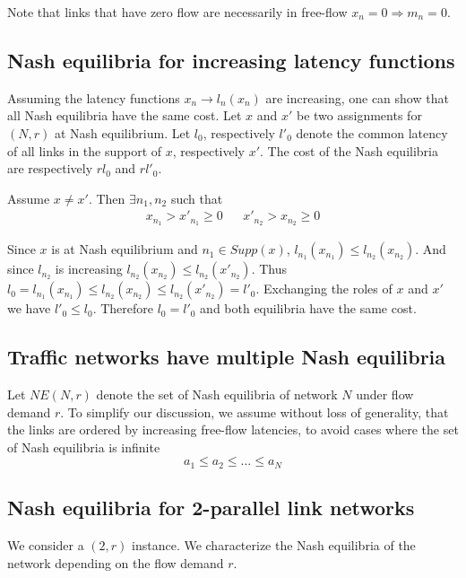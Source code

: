 Note that links that have zero flow are necessarily in free-flow $x_n = 0 \Rightarrow m_n = 0$.

\subsection{Nash equilibria for increasing latency functions}
Assuming the latency functions $x_n \rightarrow l_n(x_n)$ are increasing, one can show that all Nash equilibria have the same cost. Let $x$ and $x'$ be two assignments for $(N, r)$ at Nash equilibrium.  Let $l_0$, respectively $l'_0$ denote the common latency of all links in the support of $x$, respectively $x'$. The cost of the Nash equilibria are respectively $rl_0$ and $rl'_0$.

Assume $x \neq x'$. Then $\exists n_1, n_2$ such that
\begin{align*}
x_{n_1} > x'_{n_1} \geq 0 && x'_{n_2} > x_{n_2} \geq 0
\end{align*}

Since $x$ is at Nash equilibrium and $n_1 \in Supp(x)$, $l_{n_1}(x_{n_1}) \leq l_{n_2}(x_{n_2})$. And since $l_{n_2}$ is increasing $l_{n_2}(x_{n_2}) \leq l_{n_2}(x'_{n_2})$. Thus $l_0 = l_{n_1}(x_{n_1}) \leq l_{n_2}(x_{n_2}) \leq l_{n_2}(x'_{n_2}) = l'_0$. Exchanging the roles of $x$ and $x'$ we have $l'_0 \leq l_0$. Therefore $l_0 = l'_0$ and both equilibria have the same cost.

\subsection{Traffic networks have multiple Nash equilibria}
Let $NE(N, r)$ denote the set of Nash equilibria of network $N$ under flow demand $r$. To simplify our discussion, we assume without loss of generality, that the links are ordered by increasing free-flow latencies, to avoid cases where the set of Nash equilibria is infinite
\[
a_1 \leq a_2 \leq \dots \leq a_N
\]


\subsection{Nash equilibria for 2-parallel link networks}
We consider a $(2, r)$ instance. We characterize the Nash equilibria of the network depending on the flow demand $r$.

